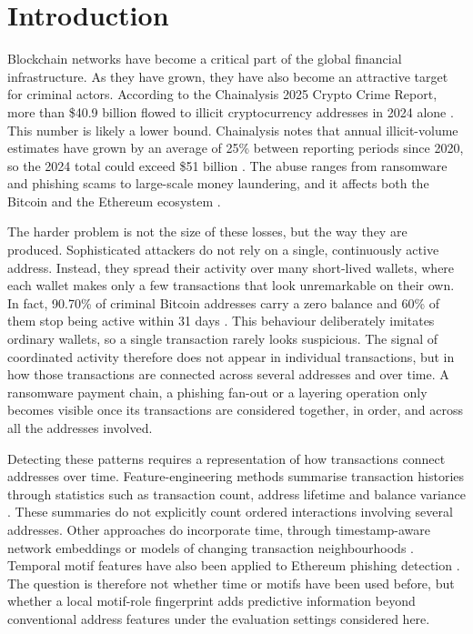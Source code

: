 \chapter{Introduction}
\label{ch:introduction}
Blockchain networks have become a critical part of the global financial infrastructure. As they have grown, they have also become an attractive target for criminal actors. According to the Chainalysis 2025 Crypto Crime Report, more than \$40.9 billion flowed to illicit cryptocurrency addresses in 2024 alone \citep{chainalysis2025, shi2025realcats}. This number is likely a lower bound. Chainalysis notes that annual illicit-volume estimates have grown by an average of 25\% between reporting periods since 2020, so the 2024 total could exceed \$51 billion \citep{chainalysis2025}. The abuse ranges from ransomware and phishing scams to large-scale money laundering, and it affects both the Bitcoin and the Ethereum ecosystem \citep{shi2025realcats, sanjalawe2023atd}.

The harder problem is not the size of these losses, but the way they are produced. Sophisticated attackers do not rely on a single, continuously active address. Instead, they spread their activity over many short-lived wallets, where each wallet makes only a few transactions that look unremarkable on their own. In fact, 90.70\% of criminal Bitcoin addresses carry a zero balance and 60\% of them stop being active within 31 days \citep{shi2025realcats}. This behaviour deliberately imitates ordinary wallets, so a single transaction rarely looks suspicious. The signal of coordinated activity therefore does not appear in individual transactions, but in how those transactions are connected across several addresses and over time. A ransomware payment chain, a phishing fan-out or a layering operation only becomes visible once its transactions are considered together, in order, and across all the addresses involved.

Detecting these patterns requires a representation of how transactions connect addresses over time. Feature-engineering methods summarise transaction histories through statistics such as transaction count, address lifetime and balance variance \citep{chen2022phishing, alemari2021labeled}. These summaries do not explicitly count ordered interactions involving several addresses. Other approaches do incorporate time, through timestamp-aware network embeddings or models of changing transaction neighbourhoods \citep{wu2020phishers, ghoshcatalog2025}. Temporal motif features have also been applied to Ethereum phishing detection \citep{wang2023temporal}. The question is therefore not whether time or motifs have been used before, but whether a local motif-role fingerprint adds predictive information beyond conventional address features under the evaluation settings considered here.

